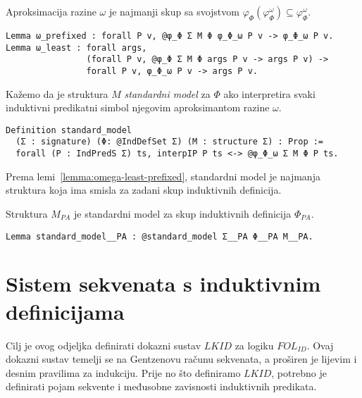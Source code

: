 \begin{lemma}\label{lemma:omega-least-prefixed}
  Aproksimacija razine \(\omega\) je najmanji skup sa svojstvom \(\varphi_{\Phi}(\varphi_{\Phi}^{\omega}) \subseteq \varphi_{\Phi}^{\omega}\).
\begin{verbatim}
Lemma ω_prefixed : forall P v, @φ_Φ Σ M Φ φ_Φ_ω P v -> φ_Φ_ω P v.
Lemma ω_least : forall args,
                (forall P v, @φ_Φ Σ M Φ args P v -> args P v) ->
                forall P v, φ_Φ_ω P v -> args P v.
\end{verbatim}
\end{lemma}

\begin{definition}
  Kažemo da je struktura \(M\) \textit{standardni model} za \(\Phi\) ako
  interpretira svaki induktivni predikatni simbol njegovim aproksimantom razine \(\omega\).
\begin{verbatim}
Definition standard_model
  (Σ : signature) (Φ: @IndDefSet Σ) (M : structure Σ) : Prop :=
  forall (P : IndPredS Σ) ts, interpIP P ts <-> @φ_Φ_ω Σ M Φ P ts.
\end{verbatim}
\end{definition}
\noindent Prema lemi~\ref{lemma:omega-least-prefixed}, standardni model je
najmanja struktura koja ima smisla za zadani skup induktivnih definicija.

\begin{proposition}
  Struktura \(M_{\mathit{PA}}\) je standardni model za skup induktivnih definicija \(\Phi_{\mathit{PA}}\).
\begin{verbatim}
Lemma standard_model__PA : @standard_model Σ__PA Φ__PA M__PA.
\end{verbatim}
\end{proposition}


\section{Sistem sekvenata s induktivnim definicijama}\label{sec:sistem-sekvenata}
Cilj je ovog odjeljka definirati dokazni sustav \(\mathit{LKID}\) za logiku \(\mathit{FOL_{ID}}\).
Ovaj dokazni sustav temelji se na Gentzenovu računu sekvenata, a proširen je lijevim i desnim pravilima za indukciju.
Prije no što definiramo \(\mathit{LKID}\), potrebno je definirati pojam sekvente i međusobne zavisnosti induktivnih predikata.

